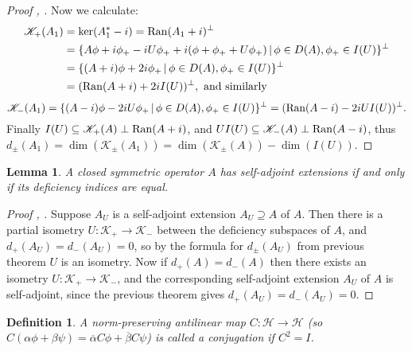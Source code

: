 \documentclass[12pt,oneside]{report}
\newtheorem{lem}[thm]{Lemma}
\newtheorem{defn}[thm]{Definition}
\begin{document}
\begin{proof}[Proof \cite{simon_classical_1998}, \cite{Reed_Simon_1975}]
    Now we calculate: \begin{align*}
        \mathscr{K}_{+}(A_{1}) &= \ker(A_{1}^{*} - i)  = \mathrm{Ran}(A_{1} + i)^{\perp}  \\
        &= \{ A\phi + i\phi_{+} - iU\phi_{+} + i(\phi + \phi_{+} + U\phi_{+}) \, | \, \phi \in D(A), \phi_{+} \in I(U) \}^{\perp}  \\
        &= \{ (A + i)\phi + 2i\phi_{+} \, | \, \phi \in D(A), \phi_{+} \in I(U) \}^{\perp} \\
        &= (\mathrm{Ran}(A+i) + 2iI(U))^{\perp}, \text{ and similarly}
    \end{align*}
    $$\mathscr{K}_{-}(A_{1}) = \{ (A - i)\phi - 2iU\phi_{+} \, | \, \phi \in D(A), \phi_{+} \in I(U) \}^{\perp} = (\mathrm{Ran}(A - i) - 2iUI(U))^\perp.$$
    Finally $I(U) \subseteq \mathscr{K}_{+}(A) \perp \mathrm{Ran}(A+i)$, and $UI(U) \subseteq \mathscr{K}_{-}(A) \perp \mathrm{Ran}(A - i)$, thus $d_{\pm}(A_{1}) = \dim(\mathscr{K}_{\pm}(A_{1})) = \dim(\mathscr{K}_{\pm}(A)) - \dim(I(U))$.
\end{proof}

\begin{lem}
    A closed symmetric operator $A$ has self-adjoint extensions if and only if its deficiency indices are equal.
\end{lem}
\begin{proof}[Proof \cite{simon_classical_1998}, \cite{Reed_Simon_1975}]
    Suppose $A_{U}$ is a self-adjoint extension $A_{U} \supseteq A$ of $A$. Then there is a partial isometry $U: \mathscr{K}_{+} \to \mathscr{K}_{-}$ between the deficiency subspaces of $A$, and $d_{+}(A_{U}) = d_{-}(A_{U}) = 0$, so by the formula for $d_{\pm}(A_{U})$ from previous theorem $U$ is an isometry. Now if $d_{+}(A) = d_{-}(A)$ then there exists an isometry $U: \mathscr{K}_{+} \to \mathscr{K}_{-}$, and the corresponding self-adjoint extension $A_{U}$ of $A$ is self-adjoint, since the previous theorem gives $d_{+}(A_{U}) = d_{-}(A_{U}) = 0$.
\end{proof}

\begin{defn}
    A norm-preserving antilinear map $C: \mathscr{H} \to \mathscr{H}$ (so $C(\alpha \phi + \beta \psi) = \overline{\alpha}C\phi + \overline{\beta}C\psi$) is called a conjugation if $C^{2} = I$.
\end{defn}
\end{document}
